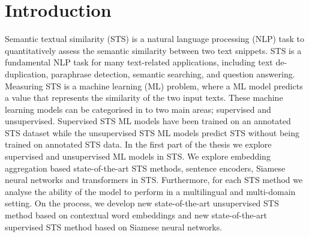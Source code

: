 
\chapter*{Introduction}
\label{cha:introduction}

Semantic textual similarity (STS) is a natural language processing (NLP) task to quantitatively assess the semantic similarity between two text snippets. STS is a fundamental NLP task for many text-related applications, including text de-duplication, paraphrase detection, semantic searching, and question answering. Measuring STS is a machine learning (ML) problem, where a ML model predicts a value that represents the similarity of the two input texts. These machine learning models can be categorised in to two main areas; supervised and unsupervised. Supervised STS ML models have been trained on an annotated STS dataset while the unsupervised STS ML models predict STS without being trained on annotated STS data. In the first part of the thesis we explore supervised and unsupervised ML models in STS. We explore embedding aggregation based state-of-the-art STS methods, sentence encoders, Siamese neural networks and transformers in STS. Furthermore, for each STS method we analyse the ability of the model to perform in a multilingual and multi-domain setting. On the process, we develop new state-of-the-art unsupervised STS method based on contextual word embeddings and new state-of-the-art supervised STS method based on Siamese neural networks. 

